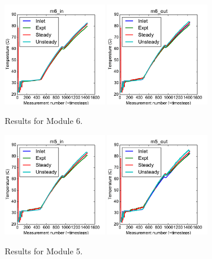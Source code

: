 \documentclass{article}
\begin{document}
\begin{figure}[!ht]
\centering
\includegraphics[width=0.4\textwidth]{../../data/ICSolar/images/Mar06_m6_in_compare.pdf}\hspace{0.05\textwidth}
\includegraphics[width=0.4\textwidth]{../../data/ICSolar/images/Mar06_m6_out_compare.pdf}\hspace{0.05\textwidth}\\
\caption{Results for Module 6.}\end{figure}
\begin{figure}[!ht]
\centering
\includegraphics[width=0.4\textwidth]{../../data/ICSolar/images/Mar06_m5_in_compare.pdf}\hspace{0.05\textwidth}
\includegraphics[width=0.4\textwidth]{../../data/ICSolar/images/Mar06_m5_out_compare.pdf}\hspace{0.05\textwidth}\\
\caption{Results for Module 5.}\end{figure}
\end{document}
